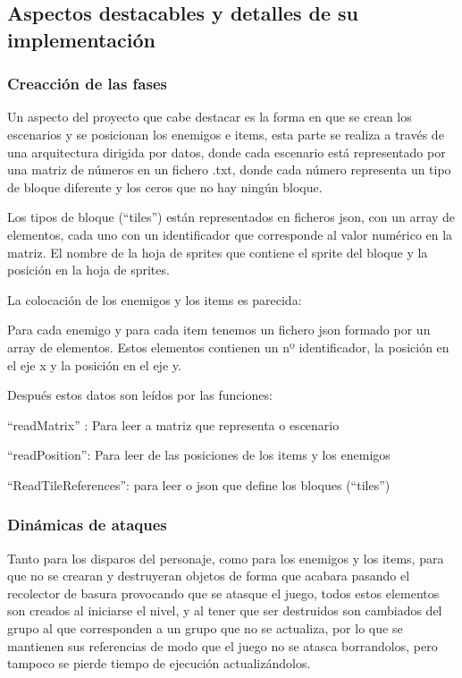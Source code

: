 \subsection{Aspectos destacables y detalles de su implementación}

\subsubsection{Creacción de las fases}
Un aspecto del proyecto que cabe destacar es la forma en que se crean los escenarios y se posicionan los enemigos e items, esta parte se realiza a través de una arquitectura dirigida por datos, donde cada escenario está representado por una matriz de números en un fichero .txt, donde cada número representa un tipo de bloque diferente y los ceros que no hay ningún bloque. 

Los tipos de bloque (“tiles”) están representados en ficheros json, con un array de elementos, cada uno con un identificador que corresponde al valor numérico en la matriz. El nombre de la hoja de sprites que contiene el sprite del bloque y la posición en la hoja de sprites. 

La colocación de los enemigos y los items es parecida:  

Para cada enemigo y para cada item tenemos un fichero json formado por un array de elementos. Estos elementos contienen un nº identificador, la posición en el eje x y la posición en el eje y. 

Después estos datos son leídos por las funciones: 

“readMatrix” : Para leer a matriz que representa o escenario 

“readPosition”: Para leer de las posiciones de los items y los enemigos 

“ReadTileReferences”: para leer o json que define los bloques (“tiles”) 

\subsubsection{Dinámicas de ataques}

Tanto para los disparos del personaje, como para los enemigos y los items, para que no se crearan y destruyeran objetos de forma que acabara pasando el recolector de basura provocando que se atasque el juego, todos estos elementos son creados al iniciarse el nivel, y al tener que ser destruidos son cambiados del grupo al que corresponden a un grupo que no se actualiza, por lo que se mantienen sus referencias de modo que el juego no se atasca borrandolos, pero tampoco se pierde tiempo de ejecución actualizándolos. 

